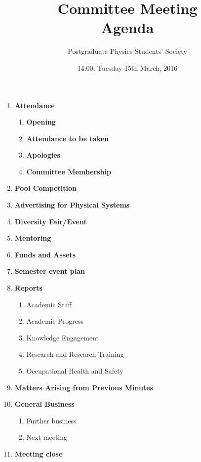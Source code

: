 \documentclass[a4paper,12pt]{article}
\title{Committee Meeting\\Agenda}
\author{Postgraduate Physics Students' Society}
\date{14.00, Tuesday 15th March, 2016}
\newcommand{\itemi}[1]{\bf\large #1}
\newcommand{\itemii}[1]{\bf #1}
\begin{document}
\thispagestyle{empty}\pagestyle{empty}
\maketitle
\begin{enumerate}
\item {\itemi Attendance}
	\begin{enumerate}
	\item {\itemii Opening}
	\item {\itemii Attendance to be taken}
	\item {\itemii Apologies}
	\item {\itemii Committee Membership}
	\end{enumerate}
\item {\itemi Pool Competition}
\item {\itemi Advertising for Physical Systems}
\item {\itemi Diversity Fair/Event}
\item {\itemi Mentoring}
\item {\itemi Funds and Assets}
\item {\itemi Semester event plan}
\item {\itemi Reports}
	\begin{enumerate}
	\item Academic Staff
	\item Academic Progress
	\item Knowledge Engagement
	\item Research and Research Training
	\item Occupational Health and Safety
	\end{enumerate}
\item {\itemi Matters Arising from Previous Minutes}
\item {\itemi General Business}
	\begin{enumerate}
	\item Further business
	\item Next meeting
	\end{enumerate}
\item {\itemi Meeting close}
\end{enumerate}
\end{document}

